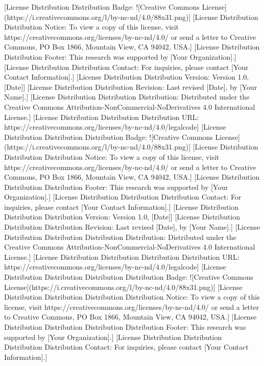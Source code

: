 [License Distribution Distribution Badge: ![Creative Commons License](https://i.creativecommons.org/l/by-nc-nd/4.0/88x31.png)]  
[License Distribution Distribution Notice: To view a copy of this license, visit https://creativecommons.org/licenses/by-nc-nd/4.0/ or send a letter to Creative Commons, PO Box 1866, Mountain View, CA 94042, USA.]  
[License Distribution Distribution Footer: This research was supported by [Your Organization].]  
[License Distribution Distribution Contact: For inquiries, please contact [Your Contact Information].]  
[License Distribution Distribution Version: Version 1.0, [Date]]  
[License Distribution Distribution Revision: Last revised [Date], by [Your Name].]  
[License Distribution Distribution Distribution: Distributed under the Creative Commons Attribution-NonCommercial-NoDerivatives 4.0 International License.]  
[License Distribution Distribution Distribution URL: https://creativecommons.org/licenses/by-nc-nd/4.0/legalcode]  
[License Distribution Distribution Distribution Badge: ![Creative Commons License](https://i.creativecommons.org/l/by-nc-nd/4.0/88x31.png)]  
[License Distribution Distribution Distribution Notice: To view a copy of this license, visit https://creativecommons.org/licenses/by-nc-nd/4.0/ or send a letter to Creative Commons, PO Box 1866, Mountain View, CA 94042, USA.]  
[License Distribution Distribution Distribution Footer: This research was supported by [Your Organization].]  
[License Distribution Distribution Distribution Contact: For inquiries, please contact [Your Contact Information].]  
[License Distribution Distribution Distribution Version: Version 1.0, [Date]]  
[License Distribution Distribution Distribution Revision: Last revised [Date], by [Your Name].]  
[License Distribution Distribution Distribution Distribution: Distributed under the Creative Commons Attribution-NonCommercial-NoDerivatives 4.0 International License.]  
[License Distribution Distribution Distribution Distribution URL: https://creativecommons.org/licenses/by-nc-nd/4.0/legalcode]  
[License Distribution Distribution Distribution Distribution Badge: ![Creative Commons License](https://i.creativecommons.org/l/by-nc-nd/4.0/88x31.png)]  
[License Distribution Distribution Distribution Distribution Notice: To view a copy of this license, visit https://creativecommons.org/licenses/by-nc-nd/4.0/ or send a letter to Creative Commons, PO Box 1866, Mountain View, CA 94042, USA.]  
[License Distribution Distribution Distribution Distribution Footer: This research was supported by [Your Organization].]  
[License Distribution Distribution Distribution Distribution Contact: For inquiries, please contact [Your Contact Information].]  
